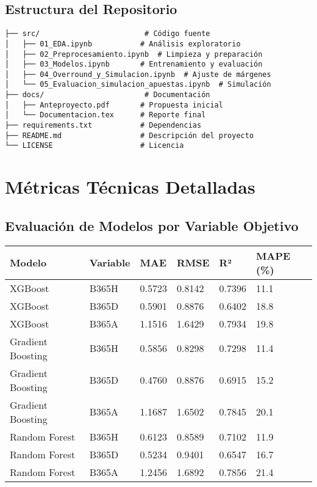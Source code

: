 \documentclass{article}
\begin{document}
\subsection{Estructura del Repositorio}
\begin{verbatim}
├── src/                        # Código fuente
│   ├── 01_EDA.ipynb           # Análisis exploratorio
│   ├── 02_Preprocesamiento.ipynb  # Limpieza y preparación
│   ├── 03_Modelos.ipynb       # Entrenamiento y evaluación
│   ├── 04_Overround_y_Simulacion.ipynb  # Ajuste de márgenes
│   └── 05_Evaluacion_simulacion_apuestas.ipynb  # Simulación
├── docs/                       # Documentación
│   ├── Anteproyecto.pdf       # Propuesta inicial
│   └── Documentacion.tex      # Reporte final
├── requirements.txt           # Dependencias
├── README.md                  # Descripción del proyecto
└── LICENSE                    # Licencia
\end{verbatim}

\newpage

\appendix

\section{Métricas Técnicas Detalladas}

\subsection{Evaluación de Modelos por Variable Objetivo}

\begin{longtable}{|p{2.5cm}|p{1.8cm}|p{1.8cm}|p{1.8cm}|p{1.8cm}|p{1.8cm}|}
\hline
\textbf{Modelo} & \textbf{Variable} & \textbf{MAE} & \textbf{RMSE} & \textbf{R²} & \textbf{MAPE (\%)} \\
\hline
\endhead
XGBoost & B365H & 0.5723 & 0.8142 & 0.7396 & 11.1 \\
\hline
XGBoost & B365D & 0.5901 & 0.8876 & 0.6402 & 18.8 \\
\hline
XGBoost & B365A & 1.1516 & 1.6429 & 0.7934 & 19.8 \\
\hline
Gradient Boosting & B365H & 0.5856 & 0.8298 & 0.7298 & 11.4 \\
\hline
Gradient Boosting & B365D & 0.4760 & 0.8876 & 0.6915 & 15.2 \\
\hline
Gradient Boosting & B365A & 1.1687 & 1.6502 & 0.7845 & 20.1 \\
\hline
Random Forest & B365H & 0.6123 & 0.8589 & 0.7102 & 11.9 \\
\hline
Random Forest & B365D & 0.5234 & 0.9401 & 0.6547 & 16.7 \\
\hline
Random Forest & B365A & 1.2456 & 1.6892 & 0.7856 & 21.4 \\
\hline
\end{longtable}
\end{document}
